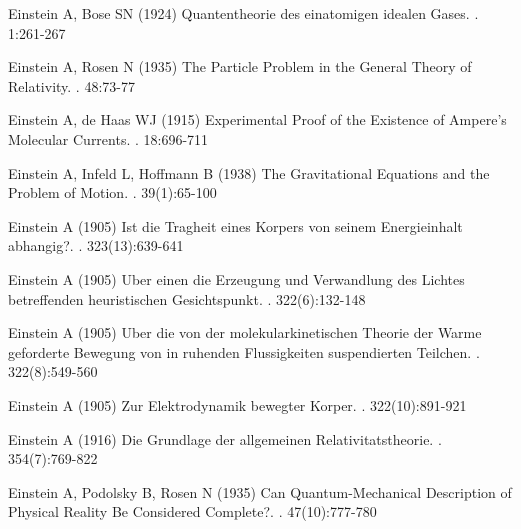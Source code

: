 \item Einstein A, Bose SN (1924) Quantentheorie des einatomigen idealen Gases. . 1:261-267

\item Einstein A, Rosen N (1935) The Particle Problem in the General Theory of Relativity. . 48:73-77\\ 

\item Einstein A, de Haas WJ (1915) Experimental Proof of the Existence of Ampere's Molecular Currents. . 18:696-711

\item Einstein A, Infeld L, Hoffmann B (1938) The Gravitational Equations and the Problem of Motion. . 39(1):65-100

\item Einstein A (1905) Ist die Tragheit eines Korpers von seinem Energieinhalt abhangig?. . 323(13):639-641\\ 

\item Einstein A (1905) Uber einen die Erzeugung und Verwandlung des Lichtes betreffenden heuristischen Gesichtspunkt. . 322(6):132-148\\ 

\item Einstein A (1905) Uber die von der molekularkinetischen Theorie der Warme geforderte Bewegung von in ruhenden Flussigkeiten suspendierten Teilchen. . 322(8):549-560\\ 

\item Einstein A (1905) Zur Elektrodynamik bewegter Korper. . 322(10):891-921\\ 

\item Einstein A (1916) Die Grundlage der allgemeinen Relativitatstheorie. . 354(7):769-822\\ 

\item Einstein A, Podolsky B, Rosen N (1935) Can Quantum-Mechanical Description of Physical Reality Be Considered Complete?. . 47(10):777-780\\ 

